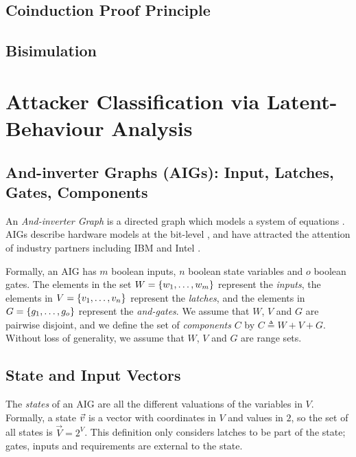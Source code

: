 \subsection{Coinduction Proof Principle}
\subsection{Bisimulation}
\section{Attacker Classification via Latent-Behaviour Analysis}
\subsection{And-inverter Graphs (AIGs): Input, Latches, Gates, Components}
An \emph{And-inverter Graph} is a directed graph which models a system of equations \cite{AIGs,AIGs2}. AIGs describe hardware models at the bit-level \cite{AIGER}, and have attracted the attention of industry partners including IBM and Intel \cite{HWMCC2014BM}. 

Formally, an AIG has $m$ boolean 
inputs, $n$ boolean state variables and $o$ boolean gates. The elements in the set 
$W=\left\{w_1, \ldots, w_m\right\}$ represent the \emph{inputs}, the elements in 
$V=\left\{v_1, \ldots, v_n\right\}$ represent the \emph{latches}, and the elements in 
$G=\left\{g_1, \ldots, g_o\right\}$ represent the \emph{and-gates}. We assume that $W$, $V$ and $G$ are pairwise disjoint, and we define the set of \emph{components} $C$ by $C\triangleq W + V + G$. Without loss of generality, we assume that $W$, $V$ and $G$ are range sets.

\subsection{State and Input Vectors}
\label{sec:Preliminaries:AIGStates}
The \emph{states} of an AIG are all the different valuations of the variables in $V$.
Formally, a state $\vec{v}$ is a vector with coordinates in $V$ and values in $2$, so the set of all states is $\vec{V}=2^V$. This definition only considers latches to be part of the state; gates, inputs and requirements are external to the state.

